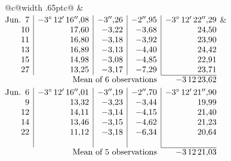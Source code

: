 \noindent\begin{tabular}{@{}c@{\hspace{.4em}\vrule width .65pt\hspace{.4em}}c@{}}
 &
 \\[.18ex]
\(\begin{array}[t]{@{}r|r|r|r|r@{}}
\text{Jun.}\enspace 7 & -3^\circ\,12'\,16''{,}08 & -3''{,}26 & -2''{,}95 & -3^\circ\,12'\,22''{,}29\\
10 & 17{,}60 & -3{,}22 & -3{,}68 & 24{,}50\\
11 & 16{,}80 & -3{,}18 & -3{,}92 & 23{,}90\\
13 & 16{,}89 & -3{,}13 & -4{,}40 & 24{,}42\\
15 & 14{,}98 & -3{,}08 & -4{,}85 & 22{,}91\\
27 & 13{,}25 & -3{,}17 & -7{,}29 & 23{,}71\\
\cline{5-5}
\multicolumn{4}{r}{\text{Mean of 6 observations}} & -3\,12\,23{,}62
\end{array}\)
&
\(\begin{array}[t]{@{}r|r|r|r|r@{}}
\text{Jun.}\enspace 6 & -3^\circ\,12'\,16''{,}01 & -3''{,}19 & -2''{,}70 & -3^\circ\,12'\,21''{,}90\\
9 & 13{,}32 & -3{,}23 & -3{,}44 & 19{,}99\\
12 & 14{,}11 & -3{,}14 & -4{,}15 & 21{,}40\\
14 & 13{,}46 & -3{,}15 & -4{,}62 & 21{,}23\\
22 & 11{,}12 & -3{,}18 & -6{,}34 & 20{,}64\\
 & & & & \\
\cline{5-5}
\multicolumn{4}{r}{\text{Mean of 5 observations}} & -3\,12\,21{,}03
\end{array}\)
\end{tabular}\par\medskip
{}
